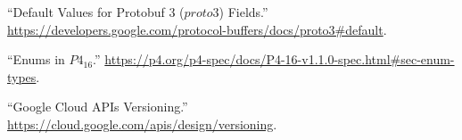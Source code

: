 \documentclass[11pt]{article}
\begin{document}
{{\begin{thebibliography}{36}
\mdbibitemlabel{{}[4]}\textquotedblleft{}Default Values for Protobuf 3 ($proto3$) Fields.\textquotedblright{} \href{https://developers.google.com/protocol-buffers/docs/proto3\%23default}{{\ttfamily https://\hspace{0pt}developers.\hspace{0pt}google.\hspace{0pt}com/\hspace{0pt}protocol-\hspace{0pt}buffers/\hspace{0pt}docs/\hspace{0pt}proto3\#\hspace{0pt}default}}.\label{protodefaults}%

\mdbibitemlabel{{}[5]}\textquotedblleft{}Enums in $P4_{16}$.\textquotedblright{} \href{https://p4.org/p4-spec/docs/P4-16-v1.1.0-spec.html\%23sec-enum-types}{{\ttfamily https://\hspace{0pt}p4.\hspace{0pt}org/\hspace{0pt}p4-\hspace{0pt}spec/\hspace{0pt}docs/\hspace{0pt}P4-\hspace{0pt}16-\hspace{0pt}v1.\hspace{0pt}1.\hspace{0pt}0-\hspace{0pt}spec.\hspace{0pt}html\#\hspace{0pt}sec-\hspace{0pt}enum-\hspace{0pt}types}}.\label{p4enums}%

\mdbibitemlabel{{}[6]}\textquotedblleft{}Google Cloud APIs Versioning.\textquotedblright{} \href{https://cloud.google.com/apis/design/versioning}{{\ttfamily https://\hspace{0pt}cloud.\hspace{0pt}google.\hspace{0pt}com/\hspace{0pt}apis/\hspace{0pt}design/\hspace{0pt}versioning}}.\label{apiversioning}%


\end{thebibliography}}}
\end{document}
